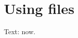 \documentclass{article}
\begin{document}
\tableofcontents
\section{Using  files}
Text:  now.
\end{document}
